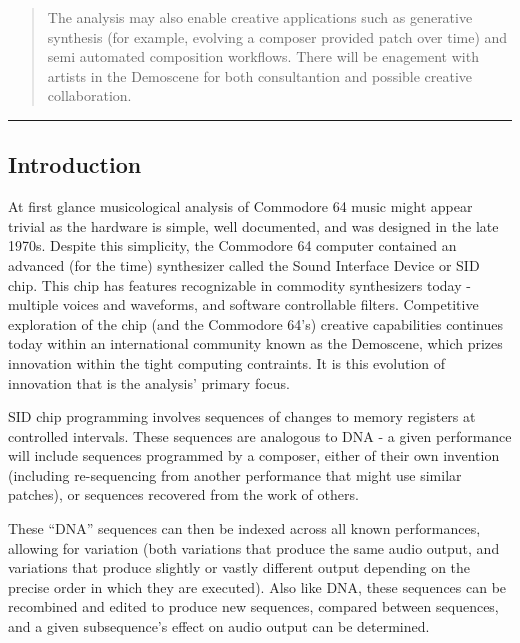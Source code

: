 \documentclass[10pt]{article}
\begin{document}
\begin{abstract}
          The analysis may also enable creative applications such
          as generative synthesis (for example, evolving a composer
          provided patch over time) and semi automated composition
          workflows.  There will be enagement with artists in
          the Demoscene for both consultantion and possible
          creative collaboration.
         \end{abstract}

        \begin{center}
                \rule{150mm}{0.2mm}
        \end{center}

        \vspace{5mm}

\begin{multicols*}{2}

  \section{Introduction}
  At first glance musicological analysis of Commodore 64 music might
  appear trivial as the hardware is simple, well documented, and was
  designed in the late 1970s. Despite this simplicity, the
  Commodore 64 computer contained an advanced (for the time) synthesizer
  called the Sound Interface Device or SID chip. This chip has features
  recognizable in commodity synthesizers today - multiple voices and
  waveforms, and software controllable filters. Competitive
  exploration of the chip (and the Commodore 64's) creative capabilities
  continues today within an international community known as the Demoscene,
  which prizes innovation within the tight computing contraints. It is this
  evolution of innovation that is the analysis' primary focus.

  SID chip programming involves sequences of changes to memory
  registers at controlled intervals. These sequences are analogous to
  DNA - a given performance will include sequences programmed by a
  composer, either of their own invention (including re-sequencing
  from another performance that might use similar patches), or
  sequences recovered from the work of others.

  These ``DNA'' sequences can then be indexed across all known
  performances, allowing for variation (both variations that produce
  the same audio output, and variations that produce slightly or
  vastly different output depending on the precise order in which they
  are executed). Also like DNA, these sequences can be recombined and
  edited to produce new sequences, compared between sequences, and a
  given subsequence's effect on audio output can be determined.


\end{multicols*}
\end{document}
